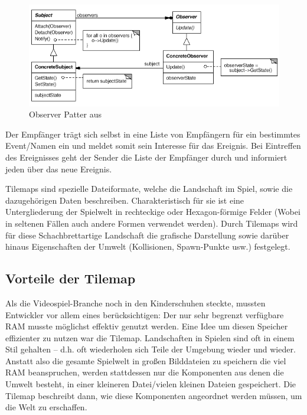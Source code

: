 \begin{figure}[H]
 \centering
  \includegraphics[width=15cm]{resources/observer_pattern}
  \caption{Observer Patter aus \cite[Design Patterns]{gamma2011patterns}}
  \label{fig:observer_pattern} 
\end{figure}

Der Empfänger trägt sich selbst in eine Liste von Empfängern für ein bestimmtes Event/Namen ein und meldet somit sein Interesse für das Ereignis. Bei Eintreffen des Ereignisses geht der Sender die Liste der Empfänger durch und informiert jeden über das neue Ereignis.



\label{sec:2_Tilemaps}

Tilemaps  sind spezielle Dateiformate, welche die Landschaft im Spiel, sowie die dazugehörigen Daten beschreiben. Charakteristisch für sie ist eine Untergliederung der Spielwelt in rechteckige oder Hexagon-förmige Felder (Wobei in seltenen Fällen auch andere Formen verwendet werden). Durch Tilemaps wird für diese Schachbrettartige Landschaft die grafische Darstellung sowie darüber hinaus Eigenschaften der Umwelt (Kollisionen, Spawn-Punkte usw.) festgelegt.

\subsection{Vorteile der Tilemap}
Als die Videospiel-Branche noch in den Kinderschuhen steckte, mussten Entwickler vor allem eines berücksichtigen: Der nur sehr begrenzt verfügbare RAM musste möglichst effektiv genutzt werden. Eine Idee um diesen Speicher effizienter zu nutzen war die Tilemap. Landschaften in Spielen sind oft in einem Stil gehalten – d.h. oft wiederholen sich Teile der Umgebung wieder und wieder. Anstatt also die gesamte Spielwelt in großen Bilddateien zu speichern die viel RAM beanspruchen, werden stattdessen nur die Komponenten aus denen die Umwelt besteht, in einer kleineren Datei/vielen kleinen Dateien gespeichert. Die Tilemap beschreibt dann, wie diese Komponenten angeordnet werden müssen, um die Welt zu erschaffen.


